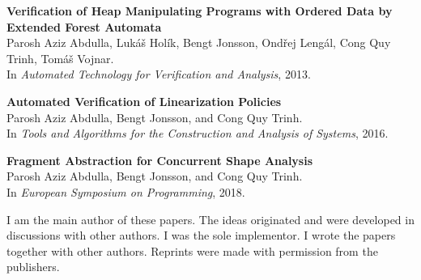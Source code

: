 % 

\newcommand{\conference}[1]{\marginpar{\tikz[baseline=(c.base)]\node(c);}}

\begin{listofpapers}
  \item \label{paper:ATVA'13}%
    {\bf Verification of Heap Manipulating Programs with
Ordered Data by Extended Forest Automata} 
    \\{\footnotesize Parosh Aziz Abdulla, Lukáš Holík, Bengt Jonsson, Ondřej Lengál, Cong Quy Trinh, Tomáš Vojnar}. 
   \\  In {\it Automated Technology for Verification and Analysis}, 2013.
    
  \item \label{paper:SAS16}%
    {\bf Automated Verification of Linearization Policies}
    \\{\footnotesize Parosh Aziz Abdulla, Bengt Jonsson, and Cong Quy Trinh}.
    \\In {\it Tools and Algorithms for the Construction and Analysis of Systems}, 2016.
    
    \item \label{paper:ESOP18}%
    {\bf Fragment Abstraction for Concurrent Shape Analysis}   
    \\{\footnotesize Parosh Aziz Abdulla, Bengt Jonsson, and Cong Quy Trinh}.
    \\In {\it European Symposium on Programming}, 2018.
\end{listofpapers}
I am the main author of these papers. The ideas originated and were developed
in discussions with other authors. I was the sole implementor. I wrote the
papers together with other authors. Reprints were made with permission from
the publishers.